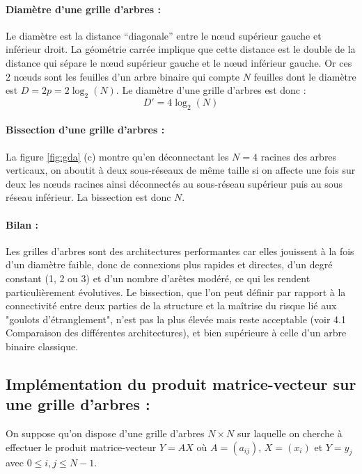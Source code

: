 \paragraph{Diamètre d'une grille d'arbres : } Le diamètre est la distance ``diagonale'' entre le nœud supérieur gauche et inférieur droit. La géométrie
carrée implique que cette distance est le double de la distance qui sépare le nœud supérieur gauche et le nœud inférieur gauche. Or ces 2
nœuds sont les feuilles d'un arbre binaire qui compte $N$ feuilles dont le diamètre est $D = 2p = 2\log_2(N)$. Le diamètre d'une grille d'arbres
est donc : \[D' = 4\log_2(N)\] 

\paragraph{Bissection d'une grille d'arbres : } La figure \ref{fig:gda} (c) montre qu'en déconnectant les $N = 4$ racines des arbres verticaux, 
on aboutit à deux sous-réseaux de même taille si on affecte une fois sur deux les nœuds racines ainsi déconnectés au
sous-réseau supérieur puis au sous réseau inférieur. La bissection est donc $N$.

\paragraph{Bilan : } Les grilles d'arbres sont des architectures performantes car elles jouissent à la fois d'un diamètre faible, donc de connexions 
plus rapides et directes, d'un degré constant (1, 2 ou 3) et d'un nombre d'arêtes modéré, ce qui les rendent particulièrement évolutives. Le bissection, que l'on peut définir par rapport à la connectivité entre deux parties de la structure et la maîtrise du risque lié aux "goulots d'étranglement", n'est pas la plus élevée mais reste acceptable (voir 4.1 Comparaison des différentes architectures), et bien supérieure à celle d'un arbre binaire classique.


\subsection{Implémentation du produit matrice-vecteur sur une grille d'arbres : }

On suppose qu'on dispose d'une grille d'arbres $N \times N$ sur laquelle on cherche à effectuer le produit matrice-vecteur $Y = AX$ où $A = (a_{ij})$, $X = (x_i)$
et $Y=y_j$ avec $0\leq i,j\leq N-1$. 


